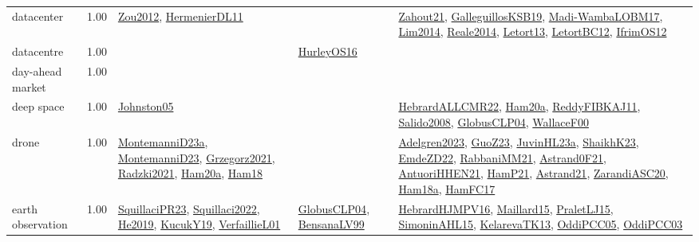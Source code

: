 {\begin{longtable}{p{3cm}r>{\raggedright\arraybackslash}p{6cm}>{\raggedright\arraybackslash}p{6cm}>{\raggedright\arraybackslash}p{8cm}}
\index{datacenter}\index{ApplicationAreas!datacenter}datacenter &  1.00 & \hyperref[detail:Zou2012]{Zou2012}, \hyperref[detail:HermenierDL11]{HermenierDL11} &  & \hyperref[detail:Zahout21]{Zahout21}, \hyperref[detail:GalleguillosKSB19]{GalleguillosKSB19}, \hyperref[detail:Madi-WambaLOBM17]{Madi-WambaLOBM17}, \hyperref[detail:Lim2014]{Lim2014}, \hyperref[detail:Reale2014]{Reale2014}, \hyperref[detail:Letort13]{Letort13}, \hyperref[detail:LetortBC12]{LetortBC12}, \hyperref[detail:IfrimOS12]{IfrimOS12}\\
\index{datacentre}\index{ApplicationAreas!datacentre}datacentre &  1.00 &  & \hyperref[detail:HurleyOS16]{HurleyOS16} & \\
\index{day-ahead market}\index{ApplicationAreas!day-ahead market}day-ahead market &  1.00 &  &  & \\
\index{deep space}\index{ApplicationAreas!deep space}deep space &  1.00 & \hyperref[detail:Johnston05]{Johnston05} &  & \hyperref[detail:HebrardALLCMR22]{HebrardALLCMR22}, \hyperref[detail:Ham20a]{Ham20a}, \hyperref[detail:ReddyFIBKAJ11]{ReddyFIBKAJ11}, \hyperref[detail:Salido2008]{Salido2008}, \hyperref[detail:GlobusCLP04]{GlobusCLP04}, \hyperref[detail:WallaceF00]{WallaceF00}\\
\index{drone}\index{ApplicationAreas!drone}drone &  1.00 & \hyperref[detail:MontemanniD23a]{MontemanniD23a}, \hyperref[detail:MontemanniD23]{MontemanniD23}, \hyperref[detail:Grzegorz2021]{Grzegorz2021}, \hyperref[detail:Radzki2021]{Radzki2021}, \hyperref[detail:Ham20a]{Ham20a}, \hyperref[detail:Ham18]{Ham18} &  & \hyperref[detail:Adelgren2023]{Adelgren2023}, \hyperref[detail:GuoZ23]{GuoZ23}, \hyperref[detail:JuvinHL23a]{JuvinHL23a}, \hyperref[detail:ShaikhK23]{ShaikhK23}, \hyperref[detail:EmdeZD22]{EmdeZD22}, \hyperref[detail:RabbaniMM21]{RabbaniMM21}, \hyperref[detail:Astrand0F21]{Astrand0F21}, \hyperref[detail:AntuoriHHEN21]{AntuoriHHEN21}, \hyperref[detail:HamP21]{HamP21}, \hyperref[detail:Astrand21]{Astrand21}, \hyperref[detail:ZarandiASC20]{ZarandiASC20}, \hyperref[detail:Ham18a]{Ham18a}, \hyperref[detail:HamFC17]{HamFC17}\\
\index{earth observation}\index{ApplicationAreas!earth observation}earth observation &  1.00 & \hyperref[detail:SquillaciPR23]{SquillaciPR23}, \hyperref[detail:Squillaci2022]{Squillaci2022}, \hyperref[detail:He2019]{He2019}, \hyperref[detail:KucukY19]{KucukY19}, \hyperref[detail:VerfaillieL01]{VerfaillieL01} & \hyperref[detail:GlobusCLP04]{GlobusCLP04}, \hyperref[detail:BensanaLV99]{BensanaLV99} & \hyperref[detail:HebrardHJMPV16]{HebrardHJMPV16}, \hyperref[detail:Maillard15]{Maillard15}, \hyperref[detail:PraletLJ15]{PraletLJ15}, \hyperref[detail:SimoninAHL15]{SimoninAHL15}, \hyperref[detail:KelarevaTK13]{KelarevaTK13}, \hyperref[detail:OddiPCC05]{OddiPCC05}, \hyperref[detail:OddiPCC03]{OddiPCC03}\\

\end{longtable}}
